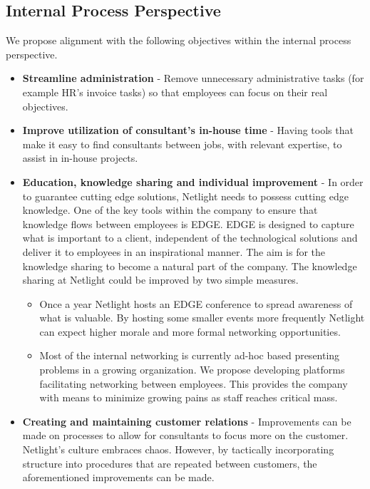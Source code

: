 \documentclass[12pt]{article}
\begin{document}
\subsection*{Internal Process Perspective}
We propose alignment with the following objectives within the internal process perspective.
\begin{itemize}
\item \textbf{Streamline administration} - Remove unnecessary administrative tasks (for example HR's invoice tasks) so that employees can focus on their real objectives.
\item \textbf{Improve utilization of consultant's in-house time} - Having tools that make it easy to find consultants between jobs, with relevant expertise, to assist in in-house projects. 
\item \textbf{Education, knowledge sharing and individual improvement} - In order to guarantee cutting edge solutions, Netlight needs to possess cutting edge knowledge. One of the key tools within the company to ensure that knowledge flows between employees is EDGE. EDGE is designed to capture what is important to a client, independent of the technological solutions and deliver it to employees in an inspirational manner. The aim is for the knowledge sharing to become a natural part of the company. The knowledge sharing at Netlight could be improved by two simple measures.
\begin{itemize}
\enlargethispage{\baselineskip}
\item Once a year Netlight hosts an EDGE conference to spread awareness of what is valuable. By hosting some smaller events more frequently Netlight can expect higher morale and more formal networking opportunities.
\item Most of the internal networking is currently ad-hoc based presenting problems in a growing organization. We propose developing platforms facilitating networking between employees. This provides the company with means to minimize growing pains as staff reaches critical mass.
\end{itemize}
\item \textbf{Creating and maintaining customer relations} - Improvements can be made on processes to allow for consultants to focus more on the customer. Netlight's culture embraces chaos. However, by tactically incorporating structure into procedures that are repeated between customers, the aforementioned improvements can be made.
\end{itemize}
\end{document}
